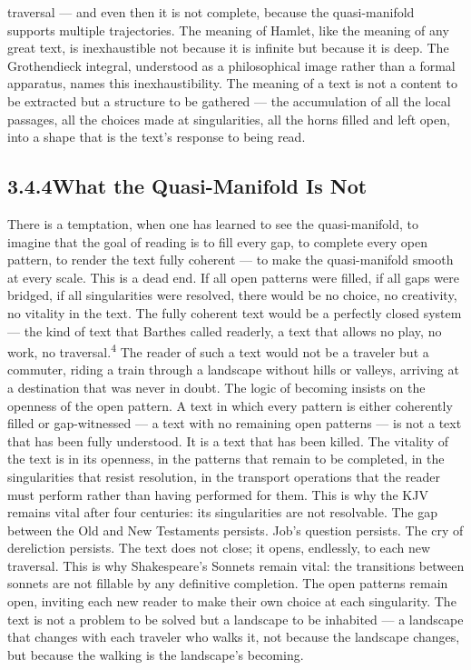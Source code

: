 traversal — and even then it is not complete, because the quasi-manifold supports multiple trajectories. The meaning of Hamlet, like the meaning of any great text, is inexhaustible not because it is infinite but because it is deep. The Grothendieck integral, understood as a philosophical image rather than a formal apparatus, names this inexhaustibility. The meaning of a text is not a content to be extracted but a structure to be gathered — the accumulation of all the local passages, all the choices made at singularities, all the horns filled and left open, into a shape that is the text’s response to being read.

\subsection{3.4.4\quad What the Quasi-Manifold Is Not}

There is a temptation, when one has learned to see the quasi-manifold, to imagine that the goal of reading is to fill every gap, to complete every open pattern, to render the text fully coherent — to make the quasi-manifold smooth at every scale. This is a dead end. If all open patterns were filled, if all gaps were bridged, if all singularities were resolved, there would be no choice, no creativity, no vitality in the text. The fully coherent text would be a perfectly closed system — the kind of text that Barthes called readerly, a text that allows no play, no work, no traversal.\textsuperscript{4} The reader of such a text would not be a traveler but a commuter, riding a train through a landscape without hills or valleys, arriving at a destination that was never in doubt. The logic of becoming insists on the openness of the open pattern. A text in which every pattern is either coherently filled or gap-witnessed — a text with no remaining open patterns — is not a text that has been fully understood. It is a text that has been killed. The vitality of the text is in its openness, in the patterns that remain to be completed, in the singularities that resist resolution, in the transport operations that the reader must perform rather than having performed for them. This is why the KJV remains vital after four centuries: its singularities are not resolvable. The gap between the Old and New Testaments persists. Job’s question persists. The cry of dereliction persists. The text does not close; it opens, endlessly, to each new traversal. This is why Shakespeare’s Sonnets remain vital: the transitions between sonnets are not fillable by any definitive completion. The open patterns remain open, inviting each new reader to make their own choice at each singularity. The text is not a problem to be solved but a landscape to be inhabited — a landscape that changes with each traveler who walks it, not because the landscape changes, but because the walking is the landscape’s becoming.


